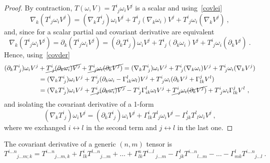     \begin{proof}
        By contraction, $T (\omega, V) = T^i_{\phantom i j} \omega_i V^j$ is a scalar and using~\eqref{covlei}
        \begin{equation*}
            \nabla_k (T^i_{\phantom i j} \omega_i V^j)  = (\nabla_k T^i_{\phantom i j}) \omega_i V^j + T^i_{\phantom i j} (\nabla_k \omega_i) V^j + T^i_{\phantom i j} \omega_i  (\nabla_k V^j) ~,
        \end{equation*}
        and, since for a scalar partial and covariant derivative are equivalent 
        \begin{equation*}
            \nabla_k (T^i_{\phantom i j} \omega_i V^j) = \partial_k (T^i_{\phantom i j} \omega_i V^j) = (\partial_k T^i_{\phantom i j}) \omega_i V^j + T^i_{\phantom i j} (\partial_k \omega_i) V^j + T^i_{\phantom i j} \omega_i  (\partial_k V^j) ~.
        \end{equation*}
        Hence, using~\eqref{covder}
        \begin{equation*}
        \begin{aligned}
            (\partial_k T^i_{\phantom i j}) \omega_i V^j & + \cancel{T^i_{\phantom i j} (\partial_k \omega_i) V^j} + \cancel{T^i_{\phantom i j} \omega_i (\partial_k V^j)} = (\nabla_k T^i_{\phantom i j}) \omega_i V^j + T^i_{\phantom i j} (\nabla_k \omega_i) V^j + T^i_{\phantom i j} \omega_i  (\nabla_k V^j) \\ & = (\nabla_k T^i_{\phantom i j}) \omega_i V^j + T^i_{\phantom i j} (\partial_k \omega_i - \Gamma^l_{ik} \omega_l) V^j + T^i_{\phantom i j} \omega_i (\partial_k V^j + \Gamma^j_{lk} V^l) \\ & = (\nabla_k T^i_{\phantom i j}) \omega_i V^j + \cancel{T^i_{\phantom i j} (\partial_k \omega_i) V^j} - T^i_{\phantom i j}  \Gamma^l_{ik} \omega_l V^j + \cancel{T^i_{\phantom i j} \omega_i (\partial_k V^j)} + T^i_{\phantom i j} \omega_i \Gamma^j_{lk} V^l ~,
        \end{aligned}
        \end{equation*}
        and isolating the covariant derivative of a 1-form 
        \begin{equation*}
            (\nabla_k T^i_{\phantom i j}) \omega_i V^j = (\partial_k T^i_{\phantom i j}) \omega_i V^j + \Gamma^i_{lk} T^l_{\phantom l j} \omega_i V^j - \Gamma^l_{jk} T^l_{\phantom i l} \omega_i  V^j ~,
        \end{equation*}
        where we exchanged $i \leftrightarrow l$ in the second term and $j \leftrightarrow l$ in the last one.
    \end{proof}
    The covariant derivative of a generic $(n,m)$ tensor is 
    \begin{equation*}
        T^{i \ldots n}_{\phantom{i \ldots n} j \ldots m; k} = T^{i \ldots n}_{\phantom{i \ldots n} j \ldots m, k} + \Gamma^i_{lk} T^{l \ldots n}_{\phantom{i \ldots n} j \ldots m} + \ldots + \Gamma^n_{lk} T^{i \ldots l}_{\phantom{i \ldots n} j \ldots m} - \Gamma^l_{jk} T^{i \ldots n}_{\phantom{i \ldots n} l \ldots m} - \ldots - \Gamma^l_{mk} T^{i \ldots n}_{\phantom{i \ldots n} j \ldots l}~.
    \end{equation*}

